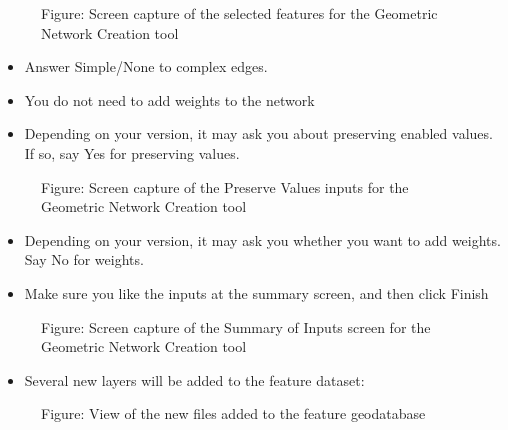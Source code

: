 \documentclass[letterpaper,10pt,english]{sphinxmanual}
\begin{document}
\begin{figure}[htbp]
\centering
\capstart

\noindent{}
\caption{Figure: Screen capture of the selected features for the Geometric Network Creation tool}\label{\detokenize{ex_2:id26}}\end{figure}
\begin{itemize}
\item {} 
Answer Simple/None to complex edges.

\item {} 
You do not need to add weights to the network

\item {} 
Depending on your version, it may ask you about preserving enabled values. If so, say Yes for preserving values.

\end{itemize}

\begin{figure}[htbp]
\centering
\capstart

\noindent{}
\caption{Figure: Screen capture of the Preserve Values inputs for the Geometric Network Creation tool}\label{\detokenize{ex_2:id27}}\end{figure}
\begin{itemize}
\item {} 
Depending on your version, it may ask you whether you want to add weights. Say No for weights.

\item {} 
Make sure you like the inputs at the summary screen, and then click Finish

\end{itemize}

\begin{figure}[htbp]
\centering
\capstart

\noindent{}
\caption{Figure: Screen capture of the Summary of Inputs screen for the Geometric Network Creation tool}\label{\detokenize{ex_2:id28}}\end{figure}
\begin{itemize}
\item {} 
Several new layers will be added to the feature dataset:

\end{itemize}

\begin{figure}[htbp]
\centering
\capstart

\noindent{}
\caption{Figure: View of the new files added to the feature geodatabase}\label{\detokenize{ex_2:id29}}\end{figure}
\end{document}
